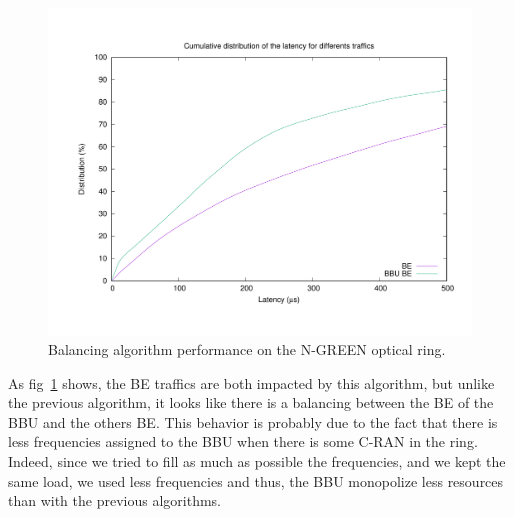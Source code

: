 \documentclass[a4paper,10pt,french,english]{article}
\begin{document}
   \begin{figure}[h]
\centering
      \includegraphics[scale=0.4]{opti.pdf}
     \caption{Balancing algorithm performance on the N-GREEN optical ring.}   \label{fig:optimres}
  \end{figure}
  
  As fig~\ref{fig:optimres} shows, the BE traffics are both impacted by this algorithm, but unlike the previous algorithm, it looks like there is a balancing between the BE of the BBU and the others BE. This behavior is probably due to the fact that there is less frequencies assigned to the BBU when there is some C-RAN in the ring. Indeed, since we tried to fill as much as possible the frequencies, and we kept the same load, we used less frequencies and thus, the BBU monopolize less resources than with the previous algorithms.
  
  

\end{document}
